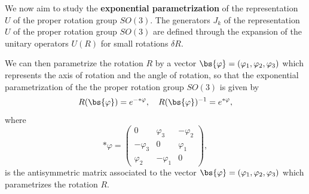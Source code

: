 \begin{example}
    We now aim to study the \textbf{exponential parametrization} of the representation \(U\) of the proper rotation group \(SO(3)\). The generators \(J_k\) of the representation \(U\) of the proper rotation group \(SO(3)\) are defined through the expansion of the unitary operators \(U(R)\) for small rotations \(\delta R\).

    We can then parametrize the rotation \(R\) by a vector \(\bs{\varphi} = (\varphi_1, \varphi_2, \varphi_3)\) which represents the axis of rotation and the angle of rotation, so that the exponential parametrization of the the proper rotation group \(SO(3)\) is given by
    \[
        R(\bs{\varphi}) = e^{- * \varphi}, \quad R(\bs{\varphi})^{-1} = e^{* \varphi},
    \]
    where
    \[
        *\varphi = \begin{pmatrix}
            0          & \varphi_3  & -\varphi_2 \\
            -\varphi_3 & 0          & \varphi_1  \\
            \varphi_2  & -\varphi_1 & 0
        \end{pmatrix},
    \]
    is the antisymmetric matrix associated to the vector \(\bs{\varphi} = (\varphi_1, \varphi_2, \varphi_3)\) which parametrizes the rotation \(R\).


\end{example}
